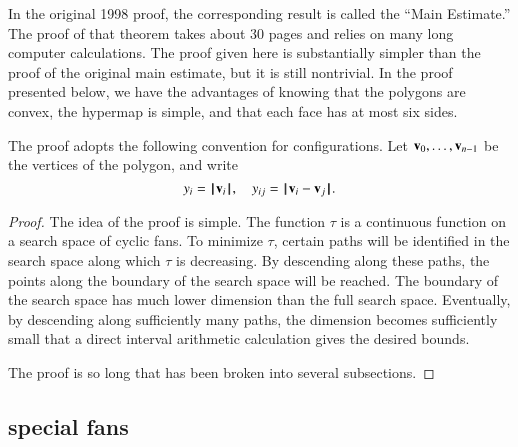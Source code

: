 \begin{remark}
In the original 1998 proof, the corresponding result
is called the ``Main Estimate.''  The proof of that 
theorem takes about 30 pages and relies on many
long computer calculations.  The proof given here
is substantially simpler than the proof of the original
main estimate, but
it is still nontrivial.  In the proof presented below, we have the advantages
of knowing that the polygons are convex, the hypermap
is simple, and that each face has at most six sides.
\end{remark}

The proof adopts the following convention for
configurations.  Let ${\mathbf v}_0,\ldots,{\mathbf v}_{n-1}$ be the vertices
of the polygon, and write
$$
y_i = {{\hskip0.1em|\hskip-0.15em|\hskip0.1em}{\mathbf v}_i{\hskip0.1em|\hskip-0.15em|\hskip0.1em}},\quad y_{ij} = {\hskip0.1em|\hskip-0.15em|\hskip0.1em}{\mathbf v}_i -  {\mathbf v}_j{\hskip0.1em|\hskip-0.15em|\hskip0.1em}.
$$
%




\begin{proof}  
The idea of the proof is simple.  The function $\tau$ is a continuous function on a search space of cyclic fans.  To minimize $\tau$, certain paths will be identified in the search space along which $\tau$ is decreasing.  By descending along these paths, the points along the boundary of the search space will be reached.  The boundary of the search space has much lower dimension than the full search space. Eventually, by descending along sufficiently many paths, the dimension becomes sufficiently small that a direct interval arithmetic calculation gives the desired bounds.
%

The proof is so long that has been broken into several subsections.
\end{proof}


\subsection{special fans}
%

